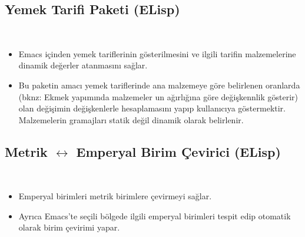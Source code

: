\documentclass[a4paper, 9pt]{extarticle}
\begin{document}
\subsection{Yemek Tarifi Paketi (ELisp)} \hfill \\
\begin{itemize}
\item Emacs içinden yemek tariflerinin gösterilmesini ve ilgili tarifin
	malzemelerine dinamik değerler atanmasını sağlar.
\item Bu paketin amacı yemek tariflerinde ana malzemeye göre belirlenen
	oranlarda (bknz: Ekmek yapımında malzemeler un ağırlığına göre değişkennlik
	gösterir) olan değişimin değişkenlerle hesaplamasını yapıp kullanıcıya
	göstermektir. Malzemelerin gramajları statik değil dinamik olarak belirlenir.
\end{itemize}


\subsection{Metrik $\longleftrightarrow$ Emperyal Birim Çevirici (ELisp)}
\hfill \\
\begin{itemize}
\item Emperyal birimleri metrik birimlere çevirmeyi sağlar.
\item Ayrıca Emacs'te seçili bölgede ilgili emperyal birimleri tespit edip
	otomatik olarak birim çevirimi yapar.
\end{itemize}

\mydiller{}
\myteknikbecerilerb{}
\mysertifikalar{}

\end{document}
